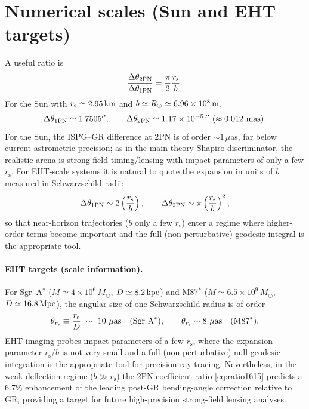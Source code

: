 \documentclass[11pt]{article}
\newcommand{\rs}{r_{\mathrm{s}}}
\begin{document}
\section{Numerical scales (Sun and EHT targets)}\label{sec:numerics}
A useful ratio is
\begin{equation}
\frac{\Delta\theta_{2{\rm PN}}}{\Delta\theta_{1{\rm PN}}}
=\frac{\pi}{2}\frac{\rs}{b}.
\end{equation}
For the Sun with $\rs\simeq 2.95\,{\rm km}$ and $b\simeq R_\odot\simeq 6.96\times 10^8\,{\rm m}$,
\begin{equation}
\Delta\theta_{1{\rm PN}}\simeq 1.7505^{\prime\prime} ,\qquad
\Delta\theta_{2{\rm PN}}\simeq 1.17\times 10^{-5}\,^{\prime\prime} \ (\approx 0.012~{\rm mas}).
\end{equation}
For the Sun, the ISPG--GR difference at 2PN is of order $\sim 1\,\mu$as, far below current astrometric precision; as in the main theory Shapiro discriminator, the realistic arena is strong-field timing/lensing with impact parameters of only a few $\rs$.
For EHT-scale systems it is natural to quote the expansion in units of $b$ measured in Schwarzschild radii:
\begin{equation}
\Delta\theta_{1{\rm PN}} \sim 2\left(\frac{\rs}{b}\right),\qquad
\Delta\theta_{2{\rm PN}}\sim \pi\left(\frac{\rs}{b}\right)^2,
\end{equation}
so that near-horizon trajectories ($b$ only a few $\rs$) enter a regime where higher-order terms become important and the full (non-perturbative) geodesic integral is the appropriate tool.


\paragraph{EHT targets (scale information).}
For Sgr~A$^\ast$ ($M\simeq 4\times 10^6\,M_\odot$, $D\simeq 8.2\,{\rm kpc}$) and M87$^\ast$ ($M\simeq 6.5\times 10^9\,M_\odot$, $D\simeq 16.8\,{\rm Mpc}$), the angular size of one Schwarzschild radius is of order
\begin{equation}
\theta_{\rs}\equiv \frac{\rs}{D}\ \sim\ 10~\mu{\rm as}\quad(\text{Sgr~A}^\ast),\qquad
\theta_{\rs}\sim 8~\mu{\rm as}\quad(\text{M87}^\ast).
\end{equation}
EHT imaging probes impact parameters of a few $\rs$, where the expansion parameter $\rs/b$ is not very small and a full (non-perturbative) null-geodesic integration is the appropriate tool for precision ray-tracing. Nevertheless, in the weak-deflection regime ($b\gg \rs$) the 2PN coefficient ratio \eqref{eq:ratio1615} predicts a $6.7\%$ enhancement of the leading post-GR bending-angle correction relative to GR, providing a target for future high-precision strong-field lensing analyses.
\end{document}
